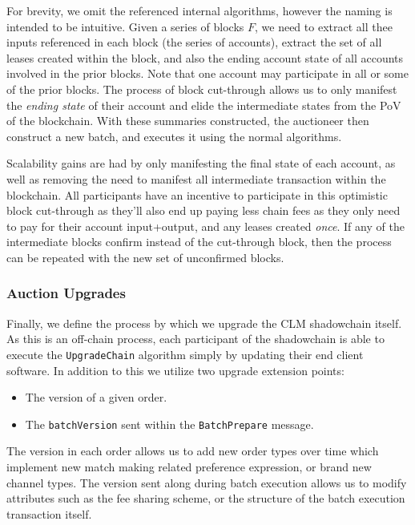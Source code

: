 \documentclass[10pt,a4paper]{article}
\theoremstyle{definition}
\begin{document}
For brevity, we omit the referenced internal algorithms, however the naming is
intended to be intuitive. Given a series of blocks $F$, we need to extract all
thee inputs referenced in each block (the series of accounts), extract the set
of all leases created within the block, and also the ending account state of
all accounts involved in the prior blocks. Note that one account may
participate in all or some of the prior blocks. The process of block
cut-through allows us to only manifest the \emph{ending state} of their account
and elide the intermediate states from the PoV of the blockchain. With these
summaries constructed, the auctioneer then construct a new batch, and executes
it using the normal algorithms.

Scalability gains are had by only manifesting the final state of each account,
as well as removing the need to manifest all intermediate transaction within
the blockchain.  All participants have an incentive to participate in this
optimistic block cut-through as they'll also end up paying less chain fees as
they only need to pay for their account input+output, and any leases created
\emph{once}. If any of the intermediate blocks confirm instead of the
cut-through block, then the process can be repeated with the new set of
unconfirmed blocks.

\subsubsection{Auction Upgrades}

Finally, we define the process by which we upgrade the CLM shadowchain itself.
As this is an off-chain process, each participant of the shadowchain is able to
execute the \texttt{UpgradeChain} algorithm simply by updating their end client
software. In addition to this we utilize two upgrade extension points:
\begin{itemize}
    \item The version of a given order.
    \item The \texttt{batchVersion} sent within the \texttt{BatchPrepare}
        message.
\end{itemize}

The version in each order allows us to add new order types over time which
implement new match making related preference expression, or brand new channel
types. The version sent along during batch execution allows us to modify
attributes such as the fee sharing scheme, or the structure of the batch
execution transaction itself.
\end{document}
